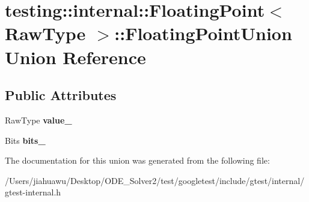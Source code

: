 \hypertarget{uniontesting_1_1internal_1_1_floating_point_1_1_floating_point_union}{}\section{testing\+:\+:internal\+:\+:Floating\+Point$<$ Raw\+Type $>$\+:\+:Floating\+Point\+Union Union Reference}
\label{uniontesting_1_1internal_1_1_floating_point_1_1_floating_point_union}
\subsection*{Public Attributes}
\begin{DoxyCompactItemize}
\item 
\mbox{\label{uniontesting_1_1internal_1_1_floating_point_1_1_floating_point_union_a4ee324889f70577721393e8e1920e4c6}} 
Raw\+Type {\bfseries value\+\_\+}
\item 
\mbox{\label{uniontesting_1_1internal_1_1_floating_point_1_1_floating_point_union_aedb69e386f5d624a016f7a781302a2bf}} 
Bits {\bfseries bits\+\_\+}
\end{DoxyCompactItemize}


The documentation for this union was generated from the following file\+:\begin{DoxyCompactItemize}
\item 
/\+Users/jiahuawu/\+Desktop/\+O\+D\+E\+\_\+\+Solver2/test/googletest/include/gtest/internal/gtest-\/internal.\+h\end{DoxyCompactItemize}
